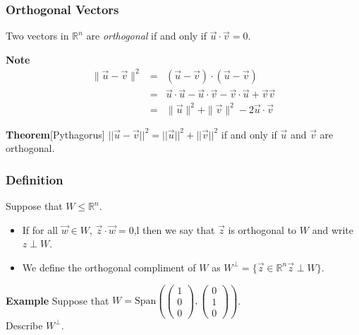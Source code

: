 \begin{frame}[fragile] \frametitle{Orthogonal Vectors}
 Two vectors in $\mathbb R^n$ are {\em orthogonal} if and only if $\vec{u}\cdot\vec{v}=0$.
  

\textbf{Note}
\begin{eqnarray*}
 \| \vec{u} -\vec{v}\|^2 & =  & (\vec{u}-\vec{v})\cdot(\vec{u}- \vec{v})\\
& = & \vec{u}\cdot \vec{u} - \vec{u} \cdot \vec{v} 
      - \vec{v} \cdot \vec{u} + \vec{v}\vec{v} \\
& = & \| \vec{u} \|^2 + \| \vec{v}\|^2 - 2 \vec{u}\cdot\vec{v}
\end{eqnarray*}


\textbf{Theorem}[Pythagorus]
 $||\vec{u} - \vec{v}||^2 = ||\vec{u}||^2 + ||\vec{v}||^2$ if and only if $\vec{u}$ and $\vec{v}$ are orthogonal.


\end{frame}

\begin{frame}[fragile] \frametitle{Definition}

Suppose that $W\le \mathbb R^n$.
\begin{itemize}
  \item  If for all $\vec{w}\in W$, $\vec{z}\cdot\vec{w}=0$,l then we say that $\vec{z}$ is orthogonal to $W$ and write $z\perp W$.
  \item We define the orthogonal compliment of $W$ as $W^{\perp}=\{\vec{z}\in \mathbb R^n \vec{z}\perp W\}$.
\end{itemize}
  

\textbf{Example}
 Suppose that $W=\mbox{Span} \left(\left(\begin{array}{r}1\\0\\0\end{array}\right), \left(\begin{array}{r} 0\\1\\0\end{array}\right)  \right)$.  \\
 Describe $W^{\perp}$.

\end{frame}


